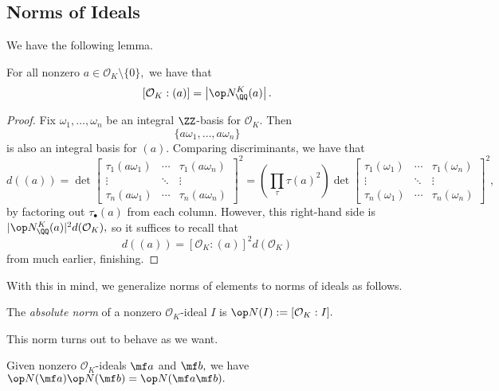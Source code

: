 \subsection{Norms of Ideals}
We have the following lemma.
\begin{lemma}
    For all nonzero $a\in\mathcal O_K\setminus\{0\},$ we have that
    \[[\mathcal O_K:(a)]=\left|\op N_\QQ^K(a)\right|.\]
\end{lemma}
\begin{proof}
    Fix $\omega_1,\ldots,\omega_n$ be an integral $\ZZ$-basis for $\mathcal O_K.$ Then
    \[\{a\omega_1,\ldots,a\omega_n\}\]
    is also an integral basis for $(a).$ Comparing discriminants, we have that
    \[d((a))=\det\begin{bmatrix}
        \tau_1(a\omega_1) & \cdots & \tau_1(a\omega_n) \\
        \vdots & \ddots & \vdots \\
        \tau_n(a\omega_1) & \cdots & \tau_n(a\omega_n)
    \end{bmatrix}^2=\left(\prod_\tau\tau(a)^2\right)\det\begin{bmatrix}
        \tau_1(\omega_1) & \cdots & \tau_1(\omega_n) \\
        \vdots & \ddots & \vdots \\
        \tau_n(\omega_1) & \cdots & \tau_n(\omega_n)
    \end{bmatrix}^2,\]
    by factoring out $\tau_\bullet(a)$ from each column. However, this right-hand side is $|\op N_\QQ^K(a)|^2d(\mathcal O_K),$ so it suffices to recall that
    \[d((a))=[\mathcal O_K:(a)]^2d(\mathcal O_K)\]
    from much earlier, finishing.
\end{proof}
With this in mind, we generalize norms of elements to norms of ideals as follows.
\begin{definition}
    The \textit{absolute norm} of a nonzero $\mathcal O_K$-ideal $I$ is $\op N(I):=[\mathcal O_K:I].$
\end{definition}
This norm turns out to behave as we want.
\begin{proposition}
    Given nonzero $\mathcal O_K$-ideals $\mf a$ and $\mf b,$ we have $\op N(\mf a)\op N(\mf b)=\op N(\mf a\mf b).$
\end{proposition}
